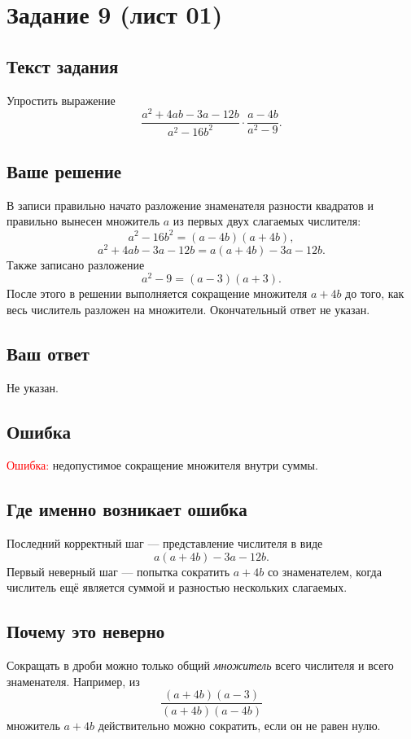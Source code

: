 \documentclass[12pt,a4paper]{article}
\newcommand{\errlabel}{\textcolor{red}{Ошибка:}}
\begin{document}
\newpage
{}\label{task:01-9}
\section*{Задание 9 (лист 01)}

\subsection*{Текст задания}
Упростить выражение
\[
\frac{a^2+4ab-3a-12b}{a^2-16b^2}\cdot\frac{a-4b}{a^2-9}.
\]

\subsection*{Ваше решение}
В записи правильно начато разложение знаменателя разности квадратов и правильно вынесен множитель $a$ из первых двух слагаемых числителя:
\[
a^2-16b^2=(a-4b)(a+4b),
\]
\[
a^2+4ab-3a-12b=a(a+4b)-3a-12b.
\]
Также записано разложение
\[
a^2-9=(a-3)(a+3).
\]
После этого в решении выполняется сокращение множителя $a+4b$ до того, как весь числитель разложен на множители. Окончательный ответ не указан.

\subsection*{Ваш ответ}
Не указан.

\subsection*{Ошибка}
\errlabel{} недопустимое сокращение множителя внутри суммы.

\subsection*{Где именно возникает ошибка}
Последний корректный шаг --- представление числителя в виде
\[
a(a+4b)-3a-12b.
\]
Первый неверный шаг --- попытка сократить $a+4b$ со знаменателем, когда числитель ещё является суммой и разностью нескольких слагаемых.

\subsection*{Почему это неверно}
Сокращать в дроби можно только общий \emph{множитель} всего числителя и всего знаменателя. Например, из
\[
\frac{(a+4b)(a-3)}{(a+4b)(a-4b)}
\]
множитель $a+4b$ действительно можно сократить, если он не равен нулю.
\end{document}

